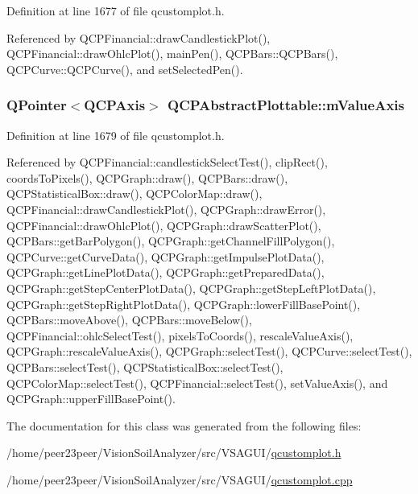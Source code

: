 Definition at line 1677 of file qcustomplot.\+h.



Referenced by Q\+C\+P\+Financial\+::draw\+Candlestick\+Plot(), Q\+C\+P\+Financial\+::draw\+Ohlc\+Plot(), main\+Pen(), Q\+C\+P\+Bars\+::\+Q\+C\+P\+Bars(), Q\+C\+P\+Curve\+::\+Q\+C\+P\+Curve(), and set\+Selected\+Pen().

\hypertarget{class_q_c_p_abstract_plottable_a2901452ca4aea911a1827717934a4bda}{}
\subsubsection[{m\+Value\+Axis}]{\setlength{\rightskip}{0pt plus 5cm}Q\+Pointer$<${\bf Q\+C\+P\+Axis}$>$ Q\+C\+P\+Abstract\+Plottable\+::m\+Value\+Axis\hspace{0.3cm}{\ttfamily [protected]}}\label{class_q_c_p_abstract_plottable_a2901452ca4aea911a1827717934a4bda}


Definition at line 1679 of file qcustomplot.\+h.



Referenced by Q\+C\+P\+Financial\+::candlestick\+Select\+Test(), clip\+Rect(), coords\+To\+Pixels(), Q\+C\+P\+Graph\+::draw(), Q\+C\+P\+Bars\+::draw(), Q\+C\+P\+Statistical\+Box\+::draw(), Q\+C\+P\+Color\+Map\+::draw(), Q\+C\+P\+Financial\+::draw\+Candlestick\+Plot(), Q\+C\+P\+Graph\+::draw\+Error(), Q\+C\+P\+Financial\+::draw\+Ohlc\+Plot(), Q\+C\+P\+Graph\+::draw\+Scatter\+Plot(), Q\+C\+P\+Bars\+::get\+Bar\+Polygon(), Q\+C\+P\+Graph\+::get\+Channel\+Fill\+Polygon(), Q\+C\+P\+Curve\+::get\+Curve\+Data(), Q\+C\+P\+Graph\+::get\+Impulse\+Plot\+Data(), Q\+C\+P\+Graph\+::get\+Line\+Plot\+Data(), Q\+C\+P\+Graph\+::get\+Prepared\+Data(), Q\+C\+P\+Graph\+::get\+Step\+Center\+Plot\+Data(), Q\+C\+P\+Graph\+::get\+Step\+Left\+Plot\+Data(), Q\+C\+P\+Graph\+::get\+Step\+Right\+Plot\+Data(), Q\+C\+P\+Graph\+::lower\+Fill\+Base\+Point(), Q\+C\+P\+Bars\+::move\+Above(), Q\+C\+P\+Bars\+::move\+Below(), Q\+C\+P\+Financial\+::ohlc\+Select\+Test(), pixels\+To\+Coords(), rescale\+Value\+Axis(), Q\+C\+P\+Graph\+::rescale\+Value\+Axis(), Q\+C\+P\+Graph\+::select\+Test(), Q\+C\+P\+Curve\+::select\+Test(), Q\+C\+P\+Bars\+::select\+Test(), Q\+C\+P\+Statistical\+Box\+::select\+Test(), Q\+C\+P\+Color\+Map\+::select\+Test(), Q\+C\+P\+Financial\+::select\+Test(), set\+Value\+Axis(), and Q\+C\+P\+Graph\+::upper\+Fill\+Base\+Point().



The documentation for this class was generated from the following files\+:\begin{DoxyCompactItemize}
\item 
/home/peer23peer/\+Vision\+Soil\+Analyzer/src/\+V\+S\+A\+G\+U\+I/\hyperlink{qcustomplot_8h}{qcustomplot.\+h}\item 
/home/peer23peer/\+Vision\+Soil\+Analyzer/src/\+V\+S\+A\+G\+U\+I/\hyperlink{qcustomplot_8cpp}{qcustomplot.\+cpp}\end{DoxyCompactItemize}

